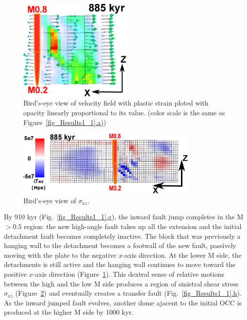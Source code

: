 \begin{figure}[h]
  \centering
    \includegraphics[width=0.5\textwidth]{./Figures/fig_Results_1_velocity_field.eps}
  \caption{Bird's-eye view of velocity field with plastic strain ploted with opacity linearly proportional to its value. (color scale is the same as Figure~\hyperref[fig_Results1_1]{\ref{fig_Results1_1}.a)})}
 \label{fig_Results_1_velocity_field}
\end{figure}

\begin{figure}[h]
   \centering
     \includegraphics[width=0.8\textwidth]{./Figures/fig_Results_1_Sxz.eps}
   \caption{Bird's-eye view of $\sigma_{xz}$.}
  \label{fig_Results_1_Sxz}
\end{figure}

By 910 kyr (Fig.~\hyperref[fig_Results1_1]{\ref{fig_Results1_1}.g}), the inward fault jump completes in the M $> 0.5$ region: the new high-angle fault takes up all the extension and the initial detachment fault becomes completely inactive. The block that was previously a hanging wall to the detachment becomes a footwall of the new fault, passively moving with the plate to the negative $x$-axis direction. At the lower M side, the detachments is still active and the hanging wall continues to move toward the positive $x$-axis direction (Figure~\hyperref[fig_Results_1_velocity_field]{\ref{fig_Results_1_velocity_field}}). This dextral sense of relative motions between the high and the low M side produces a region of sinistral shear stress $\sigma_{xz}$ (Figure~\hyperref[fig_Results_1_Sxz]{\ref{fig_Results_1_Sxz}}) and eventually creates a transfer fault (Fig.~\hyperref[fig_Results1_1]{\ref{fig_Results1_1}.h}). %
As the inward jumped fault evolves, another dome ajacent to the initial OCC is produced at the higher M side by 1000 kyr.%



